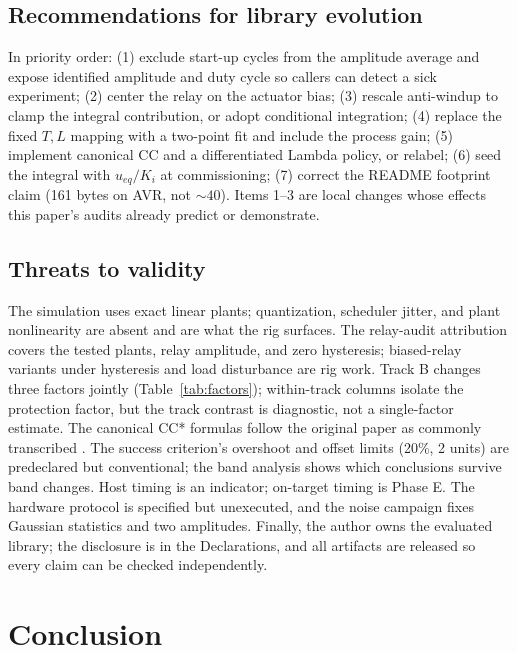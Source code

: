 \documentclass[10pt,twocolumn]{article}
\begin{document}
\subsection{Recommendations for library evolution}

In priority order: (1) exclude start-up cycles from the amplitude average and expose identified amplitude and duty cycle so callers can detect a sick experiment; (2) center the relay on the actuator bias; (3) rescale anti-windup to clamp the integral contribution, or adopt conditional integration; (4) replace the fixed $T,L$ mapping with a two-point fit and include the process gain; (5) implement canonical CC and a differentiated Lambda policy, or relabel; (6) seed the integral with $u_{eq}/K_i$ at commissioning; (7) correct the README footprint claim (161 bytes on AVR, not ${\sim}40$). Items 1--3 are local changes whose effects this paper's audits already predict or demonstrate.

\subsection{Threats to validity}

The simulation uses exact linear plants; quantization, scheduler jitter, and plant nonlinearity are absent and are what the rig surfaces. The relay-audit attribution covers the tested plants, relay amplitude, and zero hysteresis; biased-relay variants under hysteresis and load disturbance \cite{hang1993} are rig work. Track B changes three factors jointly (Table~\ref{tab:factors}); within-track columns isolate the protection factor, but the track contrast is diagnostic, not a single-factor estimate. The canonical CC* formulas follow the original paper as commonly transcribed \cite{cohen1953, odwyer2006}. The success criterion's overshoot and offset limits (20\%, 2 units) are predeclared but conventional; the band analysis shows which conclusions survive band changes. Host timing is an indicator; on-target timing is Phase E. The hardware protocol is specified but unexecuted, and the noise campaign fixes Gaussian statistics and two amplitudes. Finally, the author owns the evaluated library; the disclosure is in the Declarations, and all artifacts are released so every claim can be checked independently.

\section{Conclusion}
\end{document}
